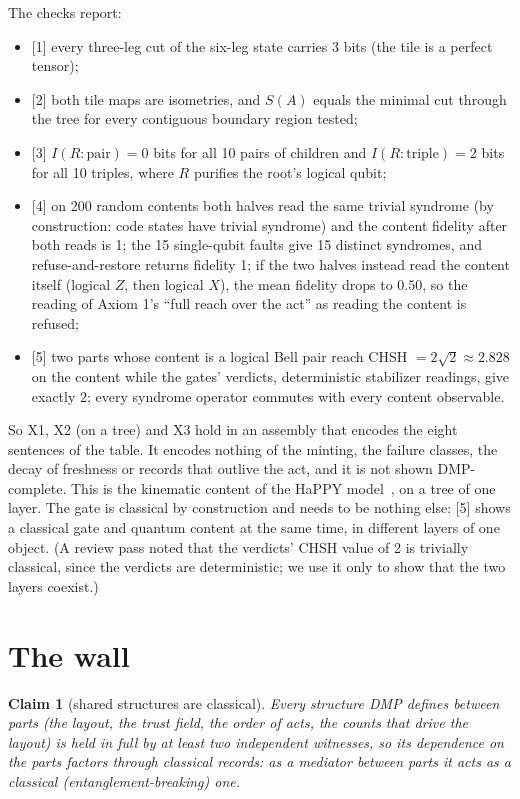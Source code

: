 \documentclass[11pt,a4paper]{article}
\newtheorem{claim}{Claim}
\theoremstyle{definition}
\theoremstyle{remark}
\newcommand{\chk}[1]{\textsf{[#1]}}
\begin{document}
\noindent The checks report:
\begin{itemize}[nosep]
\item \chk{1} every three-leg cut of the six-leg state carries 3 bits (the tile is a perfect tensor);
\item \chk{2} both tile maps are isometries, and $S(A)$ equals the minimal cut through the tree for every contiguous boundary region tested;
\item \chk{3} $I(R:\text{pair})=0$ bits for all 10 pairs of children and $I(R:\text{triple})=2$ bits for all 10 triples, where $R$
purifies the root's logical qubit;
\item \chk{4} on 200 random contents both halves read the same trivial syndrome (by construction: code states have trivial syndrome) and
the content fidelity after both reads is 1; the 15 single-qubit faults give 15 distinct syndromes, and refuse-and-restore returns
fidelity 1; if the two halves instead read the content itself (logical $Z$, then logical $X$), the mean fidelity drops to $0.50$, so the
reading of Axiom 1's ``full reach over the act'' as reading the content is refused;
\item \chk{5} two parts whose content is a logical Bell pair reach CHSH $=2\sqrt2\approx 2.828$ on the content while the gates' verdicts,
deterministic stabilizer readings, give exactly $2$; every syndrome operator commutes with every content observable.
\end{itemize}

\noindent So X1, X2 (on a tree) and X3 hold in an assembly that encodes the eight sentences of the table. It encodes nothing of the minting,
the failure classes, the decay of freshness or records that outlive the act, and it is not shown DMP-complete. This is the kinematic
content of the HaPPY model~\cite{happy}, on a tree of one layer. The gate is classical by construction and needs to be nothing else: \chk{5} shows a classical
gate and quantum content at the same time, in different layers of one object. (A review pass noted that the verdicts' CHSH value of 2 is
trivially classical, since the verdicts are deterministic; we use it only to show that the two layers coexist.)

\section{The wall}\label{sec:wall}

\begin{claim}[shared structures are classical]\label{cl:A}
Every structure DMP defines between parts (the layout, the trust field, the order of acts, the counts that drive the layout) is held in
full by at least two independent witnesses, so its dependence on the parts factors through classical records: as a mediator between parts
it acts as a classical (entanglement-breaking) one.
\end{claim}
\end{document}
